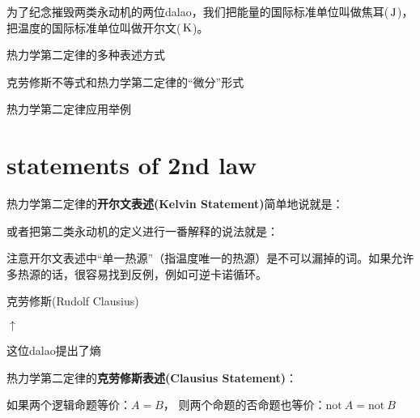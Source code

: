 \documentclass[CJK]{beamer}
\begin{document}
\begin{frame}
\bch
{}

为了纪念摧毁两类永动机的两位dalao，我们把能量的国际标准单位叫做焦耳($\,\mathrm{J}$)，把温度的国际标准单位叫做开尔文($\,\mathrm{K}$)。
\ech
\end{frame}

\begin{frame}
\bch
\bitem
\item{热力学第二定律的多种表述方式}
\item{克劳修斯不等式和热力学第二定律的“微分”形式}
\item{热力学第二定律应用举例}
\eitem
\ech
\end{frame}

\section{statements of 2nd law}


\begin{frame}
\bch
热力学第二定律的{\bf 开尔文表述(Kelvin Statement)}简单地说就是：

或者把第二类永动机的定义进行一番解释的说法就是：
\ech
\end{frame}

\begin{frame}
\bch
注意开尔文表述中“单一热源”（指温度唯一的热源）是不可以漏掉的词。如果允许多热源的话，很容易找到反例，例如可逆卡诺循环。
\ech
\end{frame}

\begin{frame}
\bch

\bcenter
克劳修斯(Rudolf Clausius)
\ecenter


\bcenter
$\uparrow$

这位dalao提出了熵
\ecenter
\ech
\end{frame}

\begin{frame}
\bch
热力学第二定律的{\bf 克劳修斯表述(Clausius Statement)}：
\ech
\end{frame}

\begin{frame}
\bch
如果两个逻辑命题等价：$A=B$， 则两个命题的否命题也等价：$\mathrm{not}\ A = \mathrm{not}\ B$
\ech
\end{frame}
\end{document}
